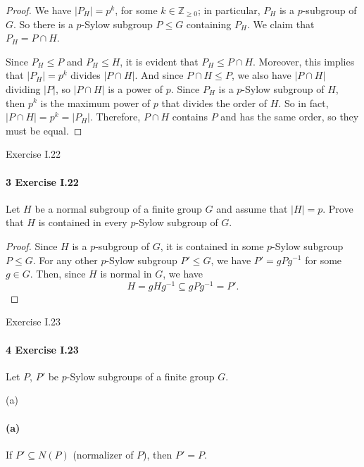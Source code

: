 \documentclass[12pt]{article}
\newlength{\myparskip}
\newenvironment{fullbox}{\begin{lrbox}{\savefullbox}\begin{minipage}{\dimexpr\textwidth-2\fboxsep\relax}\setlength{\parskip}{\myparskip}}{\end{minipage}\end{lrbox}\framebox[\textwidth]{\usebox{\savefullbox}}}
\newenvironment{pbox}[1][]{\begin{fullbox}\ifx#1\empty\else\paragraph{#1}\fi}{\end{fullbox}}
\newcommand{\Z}{\mathbb{Z}}
\newcommand{\<}{\langle}
\renewcommand{\>}{\rangle}
\begin{document}
\begin{proof}
    We have $|P_H| = p^k$, for some $k \in \Z_{\geq 0}$; in particular, $P_H$ is a $p$-subgroup of $G$. So there is a $p$-Sylow subgroup $P \leq G$ containing $P_H$. We claim that $P_H = P \cap H$.

    Since $P_H \leq P$ and $P_H \leq H$, it is evident that $P_H \leq P \cap H$. Moreover, this implies that $|P_H| = p^k$ divides $|P \cap H|$. And since $P \cap H \leq P$, we also have $|P \cap H|$ dividing $|P|$, so $|P \cap H|$ is a power of $p$. Since $P_H$ is a $p$-Sylow subgroup of $H$, then $p^k$ is the maximum power of $p$ that divides the order of $H$. So in fact, $|P \cap H| = p^k = |P_H|$. Therefore, $P \cap H$ contains $P$ and has the same order, so they must be equal.

\end{proof}



\newpage
\begin{pbox}[3 Exercise I.22]
    Let $H$ be a normal subgroup of a finite group $G$ and assume that $|H| = p$. Prove that $H$ is contained in every $p$-Sylow subgroup of $G$.
\end{pbox}

\begin{proof}
    Since $H$ is a $p$-subgroup of $G$, it is contained in some $p$-Sylow subgroup $P \leq G$. For any other $p$-Sylow subgroup $P' \leq G$, we have $P' = gPg^{-1}$ for some $g \in G$. Then, since $H$ is normal in $G$, we have
    \[
        H = gHg^{-1} \subseteq gPg^{-1} = P'.
    \]

\end{proof}


\newpage
\begin{pbox}[4 Exercise I.23]
    Let $P$, $P'$ be $p$-Sylow subgroups of a finite group $G$.
\end{pbox}

\begin{pbox}[(a)]
    If $P' \subseteq N(P)$ (normalizer of $P$), then $P' = P$.
\end{pbox}
\end{document}
